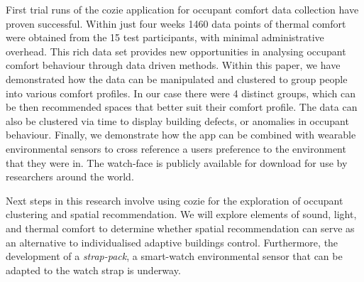 
First trial runs of the cozie application for occupant comfort data collection have proven successful. Within just four weeks 1460 data points of thermal comfort were obtained from the 15 test participants, with minimal administrative overhead. This rich data set provides new opportunities in analysing occupant comfort behaviour through data driven methods. Within this paper, we have demonstrated how the data can be manipulated and clustered to group people into various comfort profiles. In our case there were 4 distinct groups, which can be then recommended spaces that better suit their comfort profile. The data can also be clustered via time to display building defects, or anomalies in occupant behaviour. Finally, we demonstrate how the app can be combined with wearable environmental sensors to cross reference a users preference to the environment that they were in. The watch-face is publicly available for download for use by researchers around the world.

Next steps in this research involve using cozie for the exploration of occupant clustering and spatial recommendation. We will explore elements of sound, light, and thermal comfort to determine whether spatial recommendation can serve as an alternative to individualised adaptive buildings control. Furthermore, the development of a \emph{strap-pack}, a smart-watch environmental sensor that can be adapted to the watch strap is underway. 